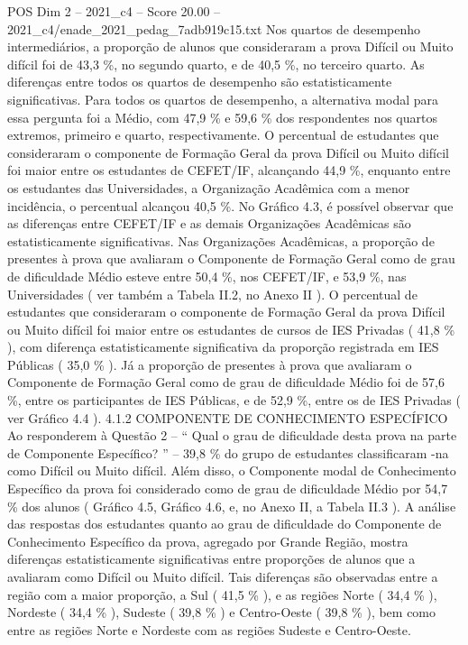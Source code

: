 \begin{textsample}{POS Dim 2 – 2021\_c4 – Score 20.00 – 2021\_c4/enade\_2021\_pedag\_7adb919c15.txt}
Nos quartos de desempenho intermediários, a proporção de alunos que consideraram a prova Difícil ou Muito difícil foi de 43,3 \%, no segundo quarto, e de 40,5 \%, no terceiro quarto.
As diferenças entre todos os quartos de desempenho são estatisticamente significativas.
Para todos os quartos de desempenho, a alternativa modal para essa pergunta foi a Médio, com 47,9 \% e 59,6 \% dos respondentes nos quartos extremos, primeiro e quarto, respectivamente.
O percentual de estudantes que consideraram o componente de Formação Geral da prova Difícil ou Muito difícil foi maior entre os estudantes de CEFET/IF, alcançando 44,9 \%, enquanto entre os estudantes das Universidades, a Organização Acadêmica com a menor incidência, o percentual alcançou 40,5 \%.
No Gráfico 4.3, é possível observar que as diferenças entre CEFET/IF e as demais Organizações Acadêmicas são estatisticamente significativas.
Nas Organizações Acadêmicas, a proporção de presentes à prova que avaliaram o Componente de Formação Geral como de grau de dificuldade Médio esteve entre 50,4 \%, nos CEFET/IF, e 53,9 \%, nas Universidades ( ver também a Tabela II.2, no Anexo II ).
O percentual de estudantes que consideraram o componente de Formação Geral da prova Difícil ou Muito difícil foi maior entre os estudantes de cursos de IES Privadas ( 41,8 \% ), com diferença estatisticamente significativa da proporção registrada em IES Públicas ( 35,0 \% ).
Já a proporção de presentes à prova que avaliaram o Componente de Formação Geral como de grau de dificuldade Médio foi de 57,6 \%, entre os participantes de IES Públicas, e de 52,9 \%, entre os de IES Privadas ( ver Gráfico 4.4 ). 4.1.2 COMPONENTE DE CONHECIMENTO ESPECÍFICO Ao responderem à Questão 2 – “ Qual o grau de dificuldade desta prova na parte de Componente Específico? ” – 39,8 \% do grupo de estudantes classificaram -na como Difícil ou Muito difícil.
Além disso, o Componente modal de Conhecimento Específico da prova foi considerado como de grau de dificuldade Médio por 54,7 \% dos alunos ( Gráfico 4.5, Gráfico 4.6, e, no Anexo II, a Tabela II.3 ).
A análise das respostas dos estudantes quanto ao grau de dificuldade do Componente de Conhecimento Específico da prova, agregado por Grande Região, mostra diferenças estatisticamente significativas entre proporções de alunos que a avaliaram como Difícil ou Muito difícil.
Tais diferenças são observadas entre a região com a maior proporção, a Sul ( 41,5 \% ), e as regiões Norte ( 34,4 \% ), Nordeste ( 34,4 \% ), Sudeste ( 39,8 \% ) e Centro-Oeste ( 39,8 \% ), bem como entre as regiões Norte e Nordeste com as regiões Sudeste e Centro-Oeste.

\end{textsample}
